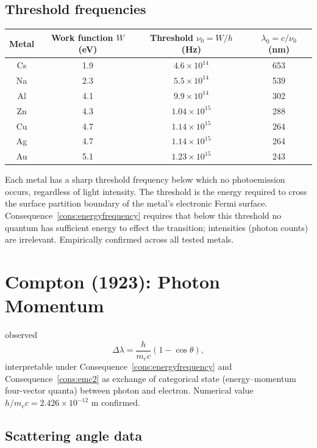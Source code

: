 \documentclass[11pt,twocolumn,a4paper]{article}
\theoremstyle{axiomstyle}
\theoremstyle{conseqstyle}
\theoremstyle{definition}
\theoremstyle{remark}
\begin{document}
\subsection{Threshold frequencies}

\begin{center}
\begin{tabular}{c|c|c|c}
\toprule
Metal & Work function $W$ (eV) & Threshold $\nu_{0}=W/h$ (Hz) & $\lambda_{0}=c/\nu_{0}$ (nm)\\
\midrule
Cs  & 1.9 & $4.6\times 10^{14}$ & 653 \\
Na  & 2.3 & $5.5\times 10^{14}$ & 539 \\
Al  & 4.1 & $9.9\times 10^{14}$ & 302 \\
Zn  & 4.3 & $1.04\times 10^{15}$ & 288 \\
Cu  & 4.7 & $1.14\times 10^{15}$ & 264 \\
Ag  & 4.7 & $1.14\times 10^{15}$ & 264 \\
Au  & 5.1 & $1.23\times 10^{15}$ & 243 \\
\bottomrule
\end{tabular}
\end{center}

Each metal has a sharp threshold frequency below which no photoemission occurs, regardless of light intensity. The threshold is the energy required to cross the surface partition boundary of the metal's electronic Fermi surface. Consequence~\ref{cons:energyfrequency} requires that below this threshold no quantum has sufficient energy to effect the transition; intensities (photon counts) are irrelevant. Empirically confirmed across all tested metals.

\section{Compton (1923): Photon Momentum}
\label{sec:compton}

\citet{compton1923} observed
\begin{equation*}
\Delta\lambda=\frac{h}{m_{e}c}(1-\cos\theta),
\end{equation*}
interpretable under Consequence~\ref{cons:energyfrequency} and Consequence~\ref{cons:emc2} as exchange of categorical state (energy--momentum four-vector quanta) between photon and electron. Numerical value $h/m_{e}c=2.426\times 10^{-12}$ m confirmed.

\subsection{Scattering angle data}
\end{document}
